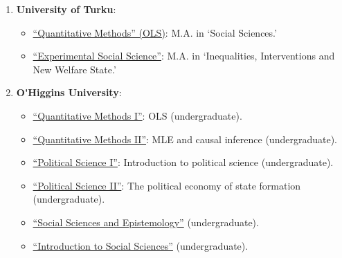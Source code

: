\begin{enumerate}

  \item {\bf University of Turku}:

      \begin{itemize}
      \item[\textcolor{gray}{\textbullet}] \href{https://github.com/hbahamonde/OLS/raw/master/Bahamonde_OLS.pdf}{``Quantitative Methods'' (OLS)}: {\color{gray} M.A. in `Social Sciences.'}
      \item[\textcolor{gray}{\textbullet}] \href{https://github.com/hbahamonde/Exp_Soc_Science/raw/main/Bahamonde_Exp_Soc_Sci.pdf}{``Experimental Social Science''}: {\color{gray}M.A. in `Inequalities, Interventions and New Welfare State.'}
    \end{itemize}


\item {\bf O\'\unskip Higgins University}:
  
    \begin{itemize}
      \item[\textcolor{gray}{\textbullet}] \href{https://github.com/hbahamonde/OLS/raw/master/Lectures/Spanish/Bahamonde_OLS_Spanish.pdf}{``Quantitative Methods I''}: {\color{gray}OLS (undergraduate)}.
      \item[\textcolor{gray}{\textbullet}] \href{https://github.com/hbahamonde/MLE/raw/master/Lectures/Spanish/Bahamonde_MLE_Spanish.pdf}{``Quantitative Methods II''}: {\color{gray}MLE and causal inference (undergraduate)}.
      \item[\textcolor{gray}{\textbullet}] \href{https://github.com/hbahamonde/Ciencia_Politica_I/raw/master/Bahamonde_Ciencia_Politica_I.pdf}{``Political Science I''}: {\color{gray} Introduction to political science (undergraduate)}.
      \item[\textcolor{gray}{\textbullet}] \href{https://github.com/hbahamonde/Ciencia_Politica_II/raw/master/Bahamonde_Ciencia_Politica_II.pdf}{``Political Science II''}: {\color{gray} The political economy of state formation (undergraduate)}.
      \item[\textcolor{gray}{\textbullet}] \href{https://github.com/hbahamonde/Social_Sciences_Epistemology_UGRAD/raw/master/Bahamonde_Social_Sciences_Epistemology_UGRAD_Syllabus.pdf}{``Social Sciences and Epistemology''} {\color{gray} (undergraduate)}.
      \item[\textcolor{gray}{\textbullet}] \href{https://github.com/hbahamonde/Intro_Ciencias_Sociales/raw/master/Bahamonde_Intro_Ciencias_Sociales.pdf}{``Introduction to Social Sciences''} {\color{gray} (undergraduate)}.
    \end{itemize}


\end{enumerate}
